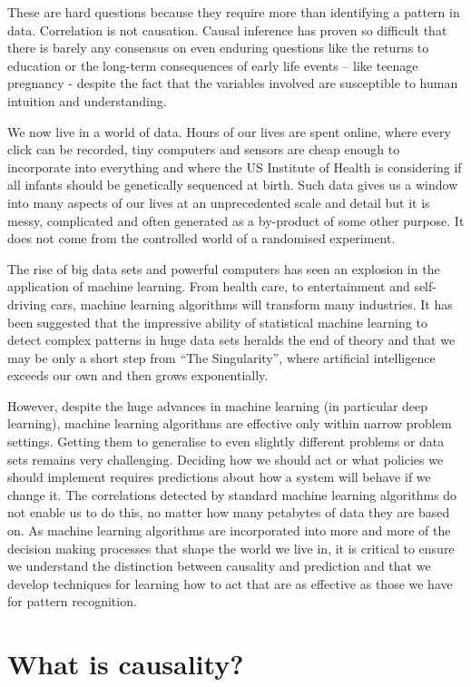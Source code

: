 \documentclass[11pt,a4paper,twoside]{report}
\newcommand{\quotes}[1]{``#1''}
\theoremstyle{plain}
\theoremstyle{definition}
\begin{document}
These are hard questions because they require more than identifying a pattern in data. Correlation is not causation. Causal inference has proven so difficult that there is barely any consensus on even enduring questions like the returns to education or the long-term consequences of early life events – like teenage pregnancy - despite the fact that the variables involved are susceptible to human intuition and understanding. 

We now live in a world of data. Hours of our lives are spent online, where every click can be recorded, tiny computers and sensors are cheap enough to incorporate into everything and where the US Institute of Health is considering if all infants should be genetically sequenced at birth. Such data gives us a window into many aspects of our lives at an unprecedented scale and detail but it is messy, complicated and often generated as a by-product of some other purpose. It does not come from the controlled world of a randomised experiment.

The rise of big data sets and powerful computers has seen an explosion in the application of machine learning. From health care, to entertainment and self-driving cars, machine learning algorithms will transform many industries. It has been suggested that the impressive ability of statistical machine learning to detect complex patterns in huge data sets heralds the end of theory \citep{anderson2008end} and that we may be only a short step from \quotes{The Singularity}, where artificial intelligence exceeds our own and then grows exponentially. 

However, despite the huge advances in machine learning (in particular deep learning), machine learning algorithms are effective only within narrow problem settings. Getting them to generalise to even slightly different problems or data sets remains very challenging. Deciding how we should act or what policies we should implement requires predictions about how a system will behave if we change it. The correlations detected by standard machine learning algorithms do not enable us to do this, no matter how many petabytes of data they are based on. As machine learning algorithms are incorporated into more and more of the decision making processes that shape the world we live in, it is critical to ensure we understand the distinction between causality and prediction and that we develop techniques for learning how to act that are as effective as those we have for pattern recognition.


\section{What is causality? }
\end{document}
